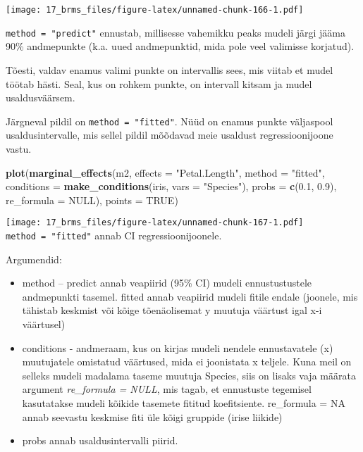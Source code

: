 \documentclass[]{article}
\newenvironment{Shaded}{\begin{snugshade}}{\end{snugshade}}
\newcommand{\KeywordTok}[1]{\textcolor[rgb]{0.13,0.29,0.53}{\textbf{#1}}}
\newcommand{\DataTypeTok}[1]{\textcolor[rgb]{0.13,0.29,0.53}{#1}}
\newcommand{\FloatTok}[1]{\textcolor[rgb]{0.00,0.00,0.81}{#1}}
\newcommand{\StringTok}[1]{\textcolor[rgb]{0.31,0.60,0.02}{#1}}
\newcommand{\OtherTok}[1]{\textcolor[rgb]{0.56,0.35,0.01}{#1}}
\newcommand{\NormalTok}[1]{#1}
\begin{document}
\texttt{[image: 17\_brms\_files/figure-latex/unnamed-chunk-166-1.pdf]}

\texttt{method\ =\ "predict"} ennustab, millisesse vahemikku peaks
mudeli järgi jääma 90\% andmepunkte (k.a. uued andmepunktid, mida pole
veel valimisse korjatud).

Tõesti, valdav enamus valimi punkte on intervallis sees, mis viitab et
mudel töötab hästi. Seal, kus on rohkem punkte, on intervall kitsam ja
mudel usaldusväärsem.

Järgneval pildil on \texttt{method\ =\ "fitted"}. Nüüd on enamus punkte
väljaspool usaldusintervalle, mis sellel pildil mõõdavad meie usaldust
regressioonijoone vastu.

\begin{Shaded}
\begin{Highlighting}[]
\KeywordTok{plot}\NormalTok{(}\KeywordTok{marginal_effects}\NormalTok{(m2, }\DataTypeTok{effects =} \StringTok{"Petal.Length"}\NormalTok{, }\DataTypeTok{method =} \StringTok{"fitted"}\NormalTok{, }\DataTypeTok{conditions =} \KeywordTok{make_conditions}\NormalTok{(iris, }\DataTypeTok{vars =} \StringTok{"Species"}\NormalTok{), }\DataTypeTok{probs =} \KeywordTok{c}\NormalTok{(}\FloatTok{0.1}\NormalTok{, }\FloatTok{0.9}\NormalTok{), }\DataTypeTok{re_formula =} \OtherTok{NULL}\NormalTok{), }\DataTypeTok{points =} \OtherTok{TRUE}\NormalTok{)}
\end{Highlighting}
\end{Shaded}

\texttt{[image: 17\_brms\_files/figure-latex/unnamed-chunk-167-1.pdf]}
\texttt{method\ =\ "fitted"} annab CI regressioonijoonele.

Argumendid:

\begin{itemize}
\item
  method -- predict annab veapiirid (95\% CI) mudeli ennustustustele
  andmepunkti tasemel. fitted annab veapiirid mudeli fitile endale
  (joonele, mis tähistab keskmist või kõige tõenäolisemat y muutuja
  väärtust igal x-i väärtusel)
\item
  conditions - andmeraam, kus on kirjas mudeli nendele ennustavatele (x)
  muutujatele omistatud väärtused, mida ei joonistata x teljele. Kuna
  meil on selleks mudeli madalama taseme muutuja Species, siis on lisaks
  vaja määrata argument \emph{re\_formula = NULL}, mis tagab, et
  ennustuste tegemisel kasutatakse mudeli kõikide tasemete fititud
  koefitsiente. re\_formula = NA annab seevastu keskmise fiti üle kõigi
  gruppide (irise liikide)
\item
  probs annab usaldusintervalli piirid.
\end{itemize}
\end{document}
